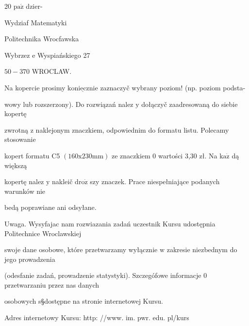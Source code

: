 \documentclass[a4paper,12pt]{article}
\begin{document}
20 $\mathrm{p}\mathrm{a}\acute{\mathrm{z}}$ dzier-

Wydziaf Matematyki

Politechnika Wrocfawska

Wybrzez $\mathrm{e}$ Wyspiańskiego 27

$50-370$ WROCLAW.

Na kopercie prosimy $\underline{\mathrm{k}\mathrm{o}\mathrm{n}\mathrm{i}\mathrm{e}\mathrm{c}\mathrm{z}\mathrm{n}\mathrm{i}\mathrm{e}}$ zaznaczyč wybrany poziom! (np. poziom podsta-

wowy lub rozszerzony). Do rozwiązań nalez $\mathrm{y}$ dołączyč zaadresowaną do siebie kopertę

zwrotną $\mathrm{z}$ naklejonym znaczkiem, odpowiednim do formatu listu. Polecamy stosowanie

kopert formatu C5 $(160\mathrm{x}230\mathrm{m}\mathrm{m})$ ze znaczkiem $0$ wartości 3,30 zł. Na $\mathrm{k}\mathrm{a}\dot{\mathrm{z}}$ dą większą

kopertę nalez $\mathrm{y}$ nakleič $\mathrm{d}\mathrm{r}\mathrm{o}\dot{\mathrm{z}}$ szy znaczek. Prace niespełniające podanych warunków nie

bedą poprawiane ani odsyłane.

Uwaga. Wysyfajac nam rozwiazania zadań uczestnik Kursu udostępnia Politechnice Wroclawskiej

swoje dane osobowe, które przetwarzamy wyłącznie $\mathrm{w}$ zakresie niezbednym do jego prowadzenia

(odesfanie zadań, prowadzenie statystyki). Szczegófowe informacje $0$ przetwarzaniu przez nas danych

osobowych s\S dostępne na stronie internetowej Kursu.

Adres internetowy Kursu: http: //www. im. pwr. edu. pl/kurs
\end{document}
